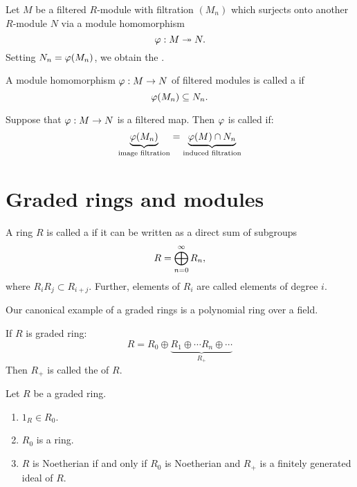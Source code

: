 \documentclass{ximera}
\begin{document}
\begin{definition}
  Let $M$ be a filtered $R$-module with filtration $(M_n)$ which
  surjects onto another $R$-module $N$ via a module homomorphism
  \[
  \varphi:M\twoheadrightarrow N.
  \]
  Setting $N_n = \varphi(M_n)$, we obtain the .
\end{definition}

\begin{definition}
  A module homomorphism $\varphi:M\to N$ of filtered modules is called a
   if
\[
\varphi(M_n)\subseteq N_n.
\]
\end{definition}

\begin{definition}
  Suppose that $\varphi:M\to N$ is a filtered map. Then $\varphi$ is called
   if:
\[
\underbrace{\varphi(M_n)}_{\text{image filtration}} = \underbrace{\varphi(M)\cap N_n}_{\text{induced filtration}}
\] 
\end{definition}



\section{Graded rings and modules}


\begin{definition}
  A ring $R$ is called a  if it can be written as a
  direct sum of subgroups
  \[
  R=\bigoplus_{n =0}^\infty R_n,
  \]
  where $R_i R_j \subset R_{i+j}$.  Further, elements of $R_i$ are
  called  elements of degree $i$.  
\end{definition}

\begin{remark}
  Our canonical example of a graded rings is a polynomial ring over a
  field.
\end{remark}



\begin{definition}
  If $R$ is graded ring:
  \[
  R = R_0\oplus \underbrace{R_1\oplus \cdots R_n\oplus \cdots}_{R_+}
  \]
  Then $R_+$ is called the  of $R$.
\end{definition}

\begin{exercise}
  Let $R$ be a graded ring.
  \begin{enumerate}
  \item $1_R\in R_0$.
  \item $R_0$ is a ring.
  \item $R$ is Noetherian if and only if $R_0$ is Noetherian and $R_+$
    is a finitely generated ideal of $R$.
  \end{enumerate}
\end{exercise}
\end{document}
